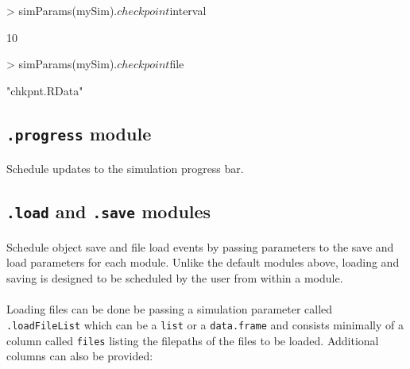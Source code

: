 \documentclass{article}
\begin{document}
\begin{Schunk}
\begin{Sinput}
> simParams(mySim)$.checkpoint$interval
\end{Sinput}
\begin{Soutput}
[1] 10
\end{Soutput}
\begin{Sinput}
> simParams(mySim)$.checkpoint$file
\end{Sinput}
\begin{Soutput}
[1] "chkpnt.RData"
\end{Soutput}
\end{Schunk}

\subsection{\texttt{.progress} module}
\paragraph{}
Schedule updates to the simulation progress bar.

\begin{Schunk}
\end{Schunk}

\subsection{\texttt{.load} and \texttt{.save} modules}\label{load-and-save-modules}
\paragraph{}
Schedule object save and file load events by passing parameters to the save and load parameters for each module. Unlike the default modules above, loading and saving is designed to be scheduled by the user from within a module.

\paragraph{}
Loading files can be done be passing a simulation parameter called \texttt{.loadFileList} which can be a \texttt{list} or a \texttt{data.frame} and consists minimally of a column called \texttt{files} listing the filepaths of the files to be loaded. Additional columns can also be provided:
\end{document}
